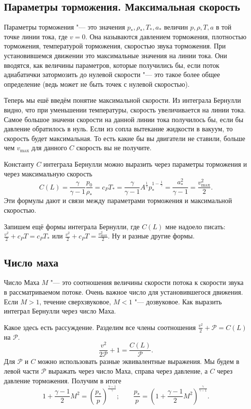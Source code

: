 \subsection{Параметры торможения. Максимальная скорость}
Параметры торможения "--- это значения $p_*,\rho_*,T_*, a_*$ величин $p,\rho,T, a$ в той точке линии тока, где $v=0$. Она называются давлением торможения, плотностью торможения, температурой торможения, скоростью звука торможения. При установившемся движении это максимальные значения на линии тока. Они вводятся, как величины параметров, которые получились бы, если поток адиабатички затормозить до нулевой скорости "--- это такое более общее определение (ведь может не быть точек с нулевой скоростью).

Теперь мы ешё введём понятие максимальной скорости. Из интеграла Бернулли видно, что при уменьшении температуры, скорость увеличивается на линии тока. Самое большое значени скорости на данной линии тока получилось бы, если бы давление обратилось в нуль. Если из сопла вытекание жидкости в вакуум, то скорость будет максимальная. То есть какие бы вы двигатели не ставили, больше чем $v_{\max}$ для данного $C$ скорость вы не получите.

Константу $C$ интеграла Бернулли можно выразить через параметры торможения и через максимальную скорость
\begin{equation}
C(L) = \frac{\gamma}{\gamma-1}\frac {p_0}{\rho_*}=c_PT_* =\frac{\gamma}{\gamma-1}A^{\frac1\gamma}p_*^{1-\frac1\gamma} = \frac{a_*^2}{\gamma-1} = \frac{v_{\max}^2}2.
\end{equation}
Эти формулы дают и связи между параметрами торможения и максимальной скоростью.

Запишем ещё формы интеграла Бернулли, где $C(L)$ мне надоело писать: $\frac{v^2}2 + c_P T = c_P T_*$ или $\frac{v^2}2+c_P T = \frac{v_{\max}^2}2$. Ну и разные другие формы.

\subsection{Число маха}
Число Маха $M$ "--- это соотношения величины скорости потока к скорости звука в рассматриваемом потоке.
 Очень важное число для установившегося движения. 
Если $M>1$, течение сверхзвуковое, $M<1$ "--- дозвуковое.
 Как выразить интеграл Бернулли через число Маха.

Какое здесь есть рассуждение.
Разделим все члены соотношения $\frac{v^2}2+\mathcal P = C(L)$ на $\mathcal P$.
\[\frac{v^2}{2\mathcal P} + 1 = \frac{C(L)}{\mathcal P}.\]
Для $\mathcal P$ и $C$ можно использовать разные эквивалентные выражения. 
Мы будем в левой части $\mathcal P$ выражать через число Маха, справа через давление, а $C$ через давление торможения.
 Получим в итоге
\[
  1+\frac{\gamma-1}2M^2 = \left(\frac{p_*}p\right)^{\frac{\gamma-1}\gamma};\qquad \frac{p_*}p = \left(1+\frac{\gamma-1}2 M^2\right)^{\frac\gamma{\gamma-1}}.
\]

